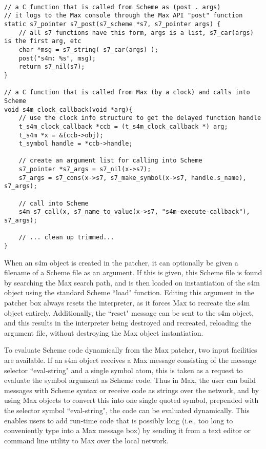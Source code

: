 \documentclass[acmsmall]{acmart}
\begin{document}
\begin{verbatim}

// a C function that is called from Scheme as (post . args)
// it logs to the Max console through the Max API "post" function
static s7_pointer s7_post(s7_scheme *s7, s7_pointer args) {
    // all s7 functions have this form, args is a list, s7_car(args) is the first arg, etc 
    char *msg = s7_string( s7_car(args) );
    post("s4m: %s", msg);
    return s7_nil(s7);
}

// a C function that is called from Max (by a clock) and calls into Scheme
void s4m_clock_callback(void *arg){
    // use the clock info structure to get the delayed function handle
    t_s4m_clock_callback *ccb = (t_s4m_clock_callback *) arg;
    t_s4m *x = &(ccb->obj);
    t_symbol handle = *ccb->handle; 
    
    // create an argument list for calling into Scheme
    s7_pointer *s7_args = s7_nil(x->s7);
    s7_args = s7_cons(x->s7, s7_make_symbol(x->s7, handle.s_name), s7_args);

    // call into Scheme 
    s4m_s7_call(x, s7_name_to_value(x->s7, "s4m-execute-callback"), s7_args);   
    
    // ... clean up trimmed... 
}

\end{verbatim}

When an s4m object is created in the patcher, it can optionally be given
a filename of a Scheme file as an argument. If this is given, this Scheme 
file is found by searching the Max search path, and is then loaded on 
instantiation of the s4m object using the standard Scheme ``load" function.
Editing this argument in the patcher box always resets the
interpreter, as it forces Max to recreate the s4m object entirely. Additionally,
the ``reset" message can be sent to the s4m object, and this results in 
the interpreter being destroyed and recreated, reloading the argument file,
without destroying the Max object instantiation.

To evaluate Scheme code dynamically from the Max patcher, two input facilities
are available. If an s4m object receives a Max message consisting of the 
message selector ``eval-string" and a single symbol atom, 
this is taken as a request to evaluate the symbol argument as Scheme code. 
Thus in Max, the user can build messages
with Scheme syntax or receive code as strings over the network, and by
using Max objects to convert this into one single quoted symbol, prepended
with the selector symbol ``eval-string", the code can be evaluated dynamically.
This enables users to add run-time code that is possibly long 
(i.e., too long to conveniently type into a Max message box) by
sending it from a text editor or command line utility to Max over the 
local network. 
\end{document}
